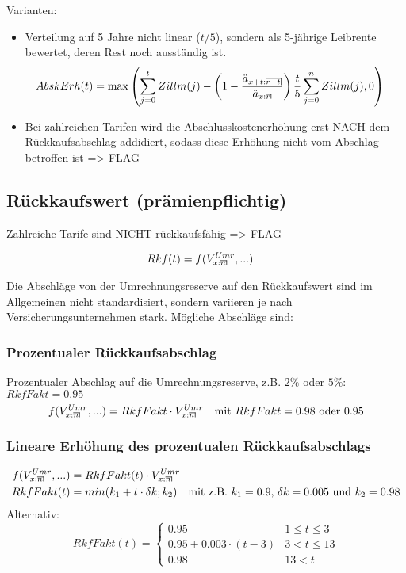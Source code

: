 \documentclass[a4paper,10pt]{article}
\makeatletter
\newcommand{\xn}{{\act[x]{n}}}
\DeclareRobustCommand{\act}[2][]{%
\def\arraystretch{0}%
\setlength\arraycolsep{0.5pt}%
\setlength\arrayrulewidth{0.5pt}%
\setbox0=\hbox{$\scriptstyle#1\ifx#1\empty{asdf}\else:\fi#2$}%
\begin{array}[b]{*2{@{}>{\scriptstyle}c}|}
\cline{2-2}%
\rule[1.25pt]{0pt}{\ht0}%
#1\ifx#1\empty\else:\fi & #2%
\end{array}%
}
\makeatother
\begin{document}
Varianten:
\begin{itemize}
 \item Verteilung auf 5 Jahre nicht linear ($t/5$), sondern als 5-jährige Leibrente bewertet, deren Rest noch ausständig ist.
 \begin{align*}
   AbskErh(t) &= \max\left(\sum_{j=0}^t Zillm(j) - \left(1-\frac{\ddot{a}_{\act[x+t]{r-t}}}{\ddot{a}_{\act[x]{r}}}\right) \frac{t}{5} \sum_{j=0}^n Zillm(j), 0\right)
 \end{align*}
 \item Bei zahlreichen Tarifen wird die Abschlusskostenerhöhung erst NACH dem Rückkaufsabschlag addidiert, 
    sodass diese Erhöhung nicht vom Abschlag betroffen ist => FLAG
\end{itemize}

\subsection{Rückkaufswert (prämienpflichtig)}

Zahlreiche Tarife sind NICHT rückkaufsfähig => FLAG

\begin{align*}
 Rkf(t) &= f(V_\xn^{Umr}, ...) 
\end{align*}

Die Abschläge von der Umrechnungsreserve auf den Rückkaufswert sind im Allgemeinen nicht 
standardisiert, sondern variieren je nach Versicherungsunternehmen stark. Mögliche
Abschläge sind:

\subsubsection*{Prozentualer Rückkaufsabschlag}
Prozentualer Abschlag auf die Umrechnungsreserve, z.B. $2\%$ oder $5\%$:
$RkfFakt=0.95$
\begin{align*}
f(V_\xn^{Umr}, ...) = RkfFakt \cdot V_\xn^{Umr} \text{\quad mit $RkfFakt=0.98$ oder $0.95$}
\end{align*}

\subsubsection*{Lineare Erhöhung des prozentualen Rückkaufsabschlags}
\begin{align*}
f(V_\xn^{Umr}, ...) &= RkfFakt(t) \cdot V_\xn^{Umr} \\
RkfFakt(t) &= min(k_1 + t \cdot \delta k; k_2) \text{\quad mit z.B. $k_1=0.9$, $\delta k = 0.005$ und $k_2=0.98$}
\end{align*}
Alternativ:
\begin{equation*}%
 RkfFakt(t) = \begin{cases}                
0.95 & 1\leq t \leq 3\\
0.95 + 0.003\cdot(t-3) & 3<t\leq 13\\
0.98 & 13<t
\end{cases}
\end{equation*}
\end{document}
